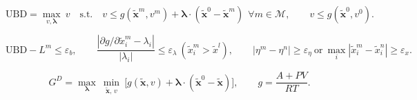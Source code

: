 \documentclass[11pt]{article}
\begin{document}
\begin{equation}
\mathrm{UBD} = \max_{v,\boldsymbol\lambda}\ v\quad \text{s.t.}\quad v \le g(\tilde{\boldsymbol x}^{m}, v^{m}) + \boldsymbol\lambda\cdot(\tilde{\boldsymbol x}^{0} - \tilde{\boldsymbol x}^{m})\ \ \forall m \in \mathcal M,\qquad v \le g(\tilde{\boldsymbol x}^{0}, v^{0}).
\label{eq:outer_approximation_bound}
\end{equation}

\begin{equation}
\mathrm{UBD} - L^{m} \le \varepsilon_b,\qquad \frac{|\partial g/\partial \tilde{x}_i^{m} - \lambda_i|}{|\lambda_i|} \le \varepsilon_\lambda\ (\tilde{x}_i^{m} > \tilde{x}^{l}),\qquad |\eta^{m} - \eta^{n}| \ge \varepsilon_\eta\ \text{or}\ \max_i |\tilde{x}_i^{m} - \tilde{x}_i^{n}| \ge \varepsilon_x.
\label{eq:candidate_phase_criteria}
\end{equation}

\begin{equation}
G^{D} = \max_{\boldsymbol\lambda}\ \min_{\tilde{\boldsymbol x},\,v}\ \Big[ g(\tilde{\boldsymbol x}, v) + \boldsymbol\lambda\cdot(\tilde{\boldsymbol x}^{0} - \tilde{\boldsymbol x}) \Big],\qquad g = \frac{A + P V}{R T}.
\label{eq:helmholtz_lagrangian_dual}
\end{equation}
\end{document}
